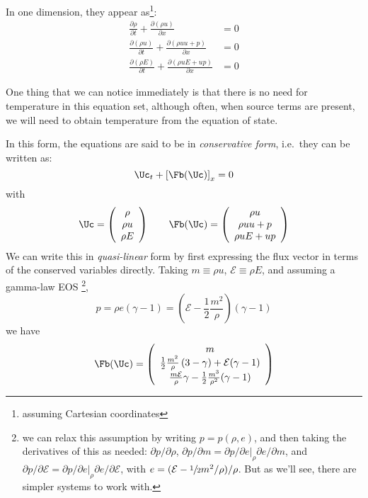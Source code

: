 In one dimension, they appear as\footnote{assuming Cartesian coordinates}:
\begin{align}
\frac{\partial \rho}{\partial t} +
    \frac{\partial (\rho u)}{\partial x} &= 0 \\
%
\frac{\partial(\rho u)}{\partial t} +
    \frac{\partial (\rho uu + p)}{\partial x} &= 0 \\
%
\frac{\partial(\rho E)}{\partial t} +
    \frac{\partial(\rho u E + u p)}{\partial x} &= 0
\end{align}

One thing that we can notice immediately is that there is no need for
temperature in this equation set, although often, when source terms
are present, we will need to obtain temperature from the equation of
state.

In this form, the equations are said to be in {\em conservative form},
i.e.\ they can be written as:
\begin{equation}
\Uc_t + \left [\Fb(\Uc) \right ]_x = 0
\end{equation}
with
\begin{equation}
\Uc = \left ( \begin{array}{c} \rho \\ \rho u \\ \rho E \end{array} \right )
%
\qquad
%
\Fb(\Uc) = \left ( \begin{array}{c} \rho u \\ \rho uu + p \\ \rho u E + up \end{array} \right )
\end{equation}
%
We can write this in {\em quasi-linear} form by first expressing the
flux vector in terms of the conserved variables directly.  Taking $m
\equiv \rho u$, $\mathcal{E} \equiv \rho E$, and assuming a gamma-law
EOS%
\footnote{we can relax this assumption by writing $p = p(\rho, e)$, and then
taking the derivatives of this as needed:  $\partial p/\partial \rho$,
$\partial p/\partial m = \partial p /\partial e|_\rho \partial e/\partial m$,
and $\partial p/\partial \mathcal{E} = \partial p/\partial e|_\rho \partial e/\partial \mathcal{E}$,
with $e = (\mathcal{E} - {\sfrac{1}{2}} m^2/\rho)/\rho$.  But as we'll see, there are
simpler systems to work with.},
\begin{equation}
p = \rho e (\gamma-1) =  \left (\mathcal{E} - \frac{1}{2} \frac{m^2}{\rho}\right )(\gamma - 1)
\end{equation}
we have
\begin{equation}
\Fb(\Uc) = \left ( \begin{array}{c}
      m \\
      \frac{1}{2}\frac{m^2}{\rho} \left (3 - \gamma \right ) +
          \mathcal{E} (\gamma - 1) \\
      \frac{m\mathcal{E}}{\rho} \gamma -\frac{1}{2} \frac{m^3}{\rho^2} (\gamma -1) \end{array} \right )
\end{equation}
